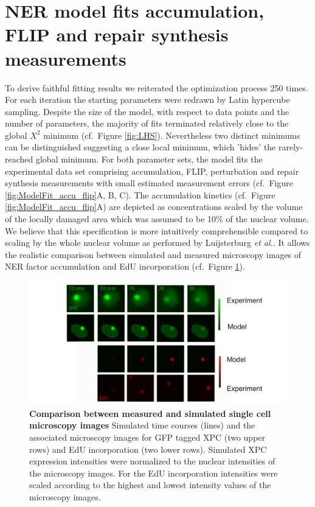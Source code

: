 \section{NER model fits accumulation, FLIP and repair synthesis measurements}    

To derive faithful fitting results we reiterated the optimization process 250 times. For each iteration the starting parameters were redrawn by Latin hypercube sampling. Despite the size of the model, with respect to data points and the number of parameters, the majority of fits terminated relatively close to the global $X^2$ minimum (cf.\ Figure \ref{fig:LHS}). Nevertheless two distinct minimums can be distinguished suggesting a close local minimum, which 'hides' the rarely-reached global minimum. For both parameter sets, the model fits the experimental data set comprising accumulation, FLIP, perturbation and repair synthesis measurements with small estimated measurement errors (cf.\ Figure \ref{fig:ModelFit_accu_flip}A, B, C). The accumulation kinetics (cf.\ Figure \ref{fig:ModelFit_accu_flip}A) are depicted as concentrations scaled by the volume of the locally damaged area which was assumed to be 10\% of the nuclear volume. We believe that this specification is more intuitively comprehensible  compared to scaling by the whole nuclear volume as performed by Luijsterburg \textit{et al.}\cite{Luijsterburg2010}. It allows the realistic comparison between simulated and measured microscopy images of NER factor accumulation and EdU incorporation (cf.\ Figure \ref{fig:Fitt_accu_Mic}).  

\begin{figure}[htbp]
\begin{center}
\includegraphics[width=1\textwidth]{Abbildungen/figure2_6_2.pdf}
\caption{\textbf{Comparison between measured and simulated single cell microscopy images} Simulated time courses (lines) and the associated microscopy images for GFP tagged XPC (two upper rows) and EdU incorporation (two lower rows). Simulated XPC expression intensities were normalized to the nuclear intensities of the microscopy images. For the EdU incorporation intensities were scaled according to the highest and lowest intensity values of the microscopy images.}
\label{fig:Fitt_accu_Mic}
\end{center}
\end{figure}

